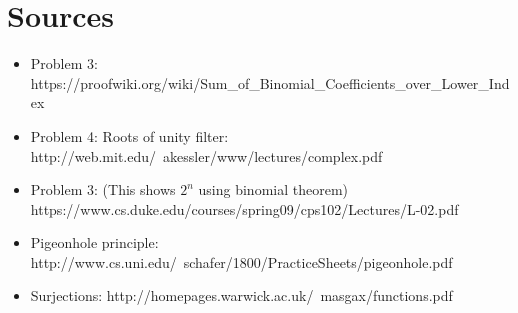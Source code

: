 \documentclass[english]{article}
\begin{document}
\section*{Sources}
\begin{itemize}
\item Problem 3:  https://proofwiki.org/wiki/Sum\_of\_Binomial\_Coefficients\_over\_Lower\_Index
\item Problem 4: Roots of unity filter: http://web.mit.edu/~akessler/www/lectures/complex.pdf
\item Problem 3: (This shows $2^n$ using binomial theorem) https://www.cs.duke.edu/courses/spring09/cps102/Lectures/L-02.pdf
\item Pigeonhole principle: http://www.cs.uni.edu/~schafer/1800/PracticeSheets/pigeonhole.pdf
\item Surjections: http://homepages.warwick.ac.uk/~masgax/functions.pdf
\end{itemize}
\end{document}
